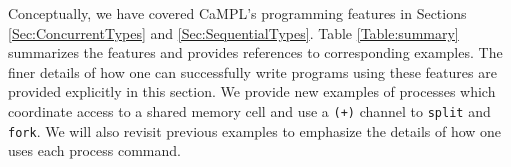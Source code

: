 \documentclass[acmsmall]{acmart}
\begin{document}

Conceptually, we have covered CaMPL's programming features in Sections \ref{Sec:ConcurrentTypes} and \ref{Sec:SequentialTypes}.
Table \ref{Table:summary} summarizes the features and provides references to corresponding examples. 
The finer details of how one can successfully write programs using these features are provided explicitly in this section.
We provide new examples of processes which coordinate access to a shared memory cell and use a \lstinline{(+)} channel to \lstinline{split} and \lstinline{fork}.
We will also revisit previous examples to emphasize the details of how one uses each process command.
\end{document}
